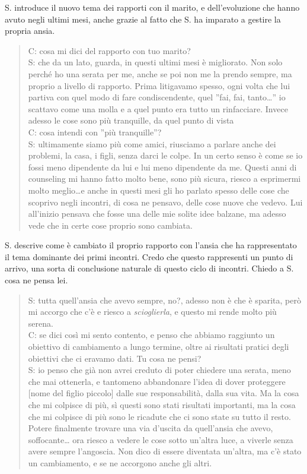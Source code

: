 \noindent S. introduce il nuovo tema dei rapporti con il marito, e dell'evoluzione che hanno avuto negli ultimi mesi, anche grazie al fatto che S. ha imparato a gestire la propria ansia.

\begin{verse}
C: cosa mi dici del rapporto con tuo marito?\\
S: che da un lato, guarda, in questi ultimi mesi è migliorato. Non solo perché ho una serata per me, anche se poi non me la prendo sempre, ma proprio a livello di rapporto. Prima litigavamo spesso, ogni volta che lui partiva con quel modo di fare condiscendente, quel ''fai, fai, tanto\ldots '' io scattavo come una molla e a quel punto era tutto un rinfacciare. Invece adesso le cose sono più tranquille, da quel punto di vista\\
C: cosa intendi con ''più tranquille''?\\
S: ultimamente siamo più come amici, riusciamo a parlare anche dei problemi, la casa, i figli, senza darci le colpe. In un certo senso è come se io fossi meno dipendente da lui e lui meno dipendente da me. Questi anni di counseling mi hanno fatto molto bene, sono più sicura, riesco a esprimermi molto meglio\ldots e anche in questi mesi gli ho parlato spesso delle cose che scoprivo negli incontri, di cosa ne pensavo, delle cose nuove che vedevo. Lui all'inizio pensava che fosse una delle mie solite idee balzane, ma adesso vede che in certe cose proprio sono cambiata.
\end{verse}

\noindent S. descrive come è cambiato il proprio rapporto con l'ansia che ha rappresentato il tema dominante dei primi incontri. Credo che questo rappresenti un punto di arrivo, una sorta di conclusione naturale di questo ciclo di incontri. Chiedo a S. cosa ne pensa lei.

\begin{verse}
S: tutta quell'ansia che avevo sempre, no?, adesso non è che è sparita, però mi accorgo che c'è e riesco a \emph{scioglierla}, e questo mi rende molto più serena.\\
C: se dici così mi sento contento, e penso che abbiamo raggiunto un obiettivo di cambiamento a lungo termine, oltre ai risultati pratici degli obiettivi che ci eravamo dati. Tu cosa ne pensi?\\
S: io penso che già non avrei creduto di poter chiedere una serata, meno che mai ottenerla, e tantomeno abbandonare l'idea di dover proteggere [nome del figlio piccolo] dalle sue responsabilità, dalla sua vita. Ma la cosa che mi colpisce di più, sì questi sono stati risultati importanti, ma la cosa che mi colpisce di più sono le ricadute che ci sono state su tutto il resto. Potere finalmente trovare una via d'uscita da quell'ansia che avevo, soffocante\ldots{} ora riesco a vedere le cose sotto un'altra luce, a viverle senza avere sempre l'angoscia. Non dico di essere diventata un'altra, ma c'è stato un cambiamento, e se ne accorgono anche gli altri.\\
\end{verse}

